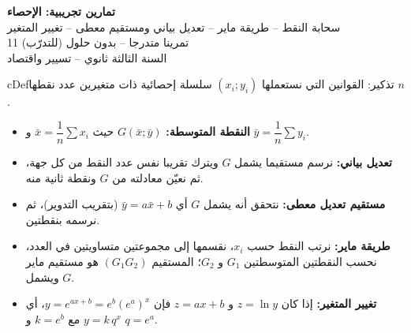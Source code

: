 \documentclass[12pt,a4paper]{article}
\newenvironment{BOX}[2]{\begin{otherlanguage}{english}\begin{arbox}{#1}{#2}}{\end{arbox}\end{otherlanguage}}
\newenvironment{tarif}[1][تعريف]{\begin{BOX}{cDef}{#1}}{\end{BOX}}
\newenvironment{LTR}{\begin{otherlanguage}{english}}{\end{otherlanguage}}
\begin{document}
\begin{LTR}
\begin{tcolorbox}[enhanced,colback=cSec,colframe=cSec,arc=3mm,halign=center,boxrule=0pt,top=12pt,bottom=12pt,before upper={\selectlanguage{arabic}}]
{\color{white}\fontsize{24}{32}\selectfont\bfseries تمارين تجريبية: الإحصاء}\\[8pt]
{\color{white}\large سحابة النقط -- طريقة ماير -- تعديل بياني ومستقيم معطى -- تغيير المتغير}\\[5pt]
{\color{white}\large 11 تمرينا متدرجا -- بدون حلول (للتدرّب)}\\[5pt]{\color{white}\large السنة الثالثة ثانوي -- تسيير واقتصاد}
\end{tcolorbox}
\end{LTR}

\begin{tarif}[تذكير: القوانين التي نستعملها]
$(x_i;y_i)$ سلسلة إحصائية ذات متغيرين عدد نقطها $n$.
\begin{itemize}
\item \textbf{النقطة المتوسطة:} $G(\bar x;\bar y)$ حيث $\bar x=\dfrac{1}{n}\sum x_i$ و $\bar y=\dfrac{1}{n}\sum y_i$.
\item \textbf{تعديل بياني:} نرسم مستقيما يشمل $G$ ويترك تقريبا نفس عدد النقط من كل جهة، ثم نعيّن معادلته من $G$ ونقطة ثانية منه.
\item \textbf{مستقيم تعديل معطى:} نتحقق أنه يشمل $G$ أي $\bar y=a\bar x+b$ (بتقريب التدوير)، ثم نرسمه بنقطتين.
\item \textbf{طريقة ماير:} نرتب النقط حسب $x_i$، نقسمها إلى مجموعتين متساويتين في العدد، نحسب النقطتين المتوسطتين $G_1$ و $G_2$؛ المستقيم $(G_1G_2)$ هو مستقيم ماير ويشمل $G$.
\item \textbf{تغيير المتغير:} إذا كان $z=\ln y$ و $z=ax+b$ فإن $y=e^{ax+b}=e^{b}\left(e^{a}\right)^{x}$، أي $y=k\,q^{x}$ مع $k=e^{b}$ و $q=e^{a}$.
\end{itemize}
\end{tarif}
\end{document}
